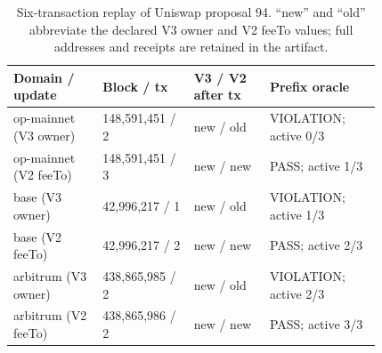 \begin{table}[t]\centering\scriptsize
\caption{Six-transaction replay of Uniswap proposal 94. ``new'' and ``old'' abbreviate the declared V3 owner and V2 feeTo values; full addresses and receipts are retained in the artifact.}
\label{tab:real-replay}
\begin{tabular}{@{}p{0.20\linewidth}p{0.20\linewidth}p{0.17\linewidth}p{0.25\linewidth}@{}}\toprule
Domain / update & Block / tx & V3 / V2 after tx & Prefix oracle \\ \midrule
op-mainnet (V3 owner) & 148,591,451 / 2 & new / old & VIOLATION; active 0/3 \\
op-mainnet (V2 feeTo) & 148,591,451 / 3 & new / new & PASS; active 1/3 \\
base (V3 owner) & 42,996,217 / 1 & new / old & VIOLATION; active 1/3 \\
base (V2 feeTo) & 42,996,217 / 2 & new / new & PASS; active 2/3 \\
arbitrum (V3 owner) & 438,865,985 / 2 & new / old & VIOLATION; active 2/3 \\
arbitrum (V2 feeTo) & 438,865,986 / 2 & new / new & PASS; active 3/3 \\
\bottomrule
\end{tabular}
\end{table}
